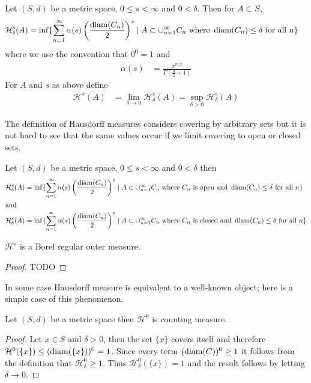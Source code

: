 \begin{defn}Let $(S,d)$ be a metric space, $0 \leq s < \infty$ and $0
  < \delta$.  Then for $A \subset S$, 
\begin{align*}
\mathcal{H}^s_\delta(A) &= \inf \lbrace \sum_{n=1}^\infty \alpha(s)
\left ( \frac{\operatorname*{diam}(C_n)}{2}\right )^s \mid A \subset
\cup_{n=1}^\infty C_n \text{ where } \operatorname*{diam}(C_n) \leq \delta \text{ for
  all } n\rbrace
\end{align*}
where we use the convention that $0^0=1$ and
\begin{align*}
\alpha(s) &= \frac{\pi^{n/2}}{\Gamma(\frac{n}{2} + 1)}
\end{align*}
For $A$ and $s$ as above define
\begin{align*}
\mathcal{H}^s(A) &= \lim_{\delta \to 0} \mathcal{H}_\delta^s(A) = \sup_{\delta>0} \mathcal{H}_\delta^s(A)
\end{align*}
\end{defn}

The definition of Hausdorff measures considers covering by arbitrary sets but it is not hard to see that 
the same values occur if we limit covering to open or closed sets.
\begin{prop}\label{HausdorffMeasureByOpenClosedCoverings}Let $(S,d)$ be a metric space, $0 \leq s < \infty$ and $0
  < \delta$ then 
\begin{align*}
\mathcal{H}^s_\delta(A) &= \inf \lbrace \sum_{n=1}^\infty \alpha(s)
\left ( \frac{\operatorname*{diam}(C_n)}{2}\right )^s \mid A \subset
\cup_{n=1}^\infty C_n \text{ where $C_n$ is open and } \operatorname*{diam}(C_n) \leq \delta \text{ for
  all } n\rbrace \\
\intertext{and}
\mathcal{H}^s_\delta(A) &= \inf \lbrace \sum_{n=1}^\infty \alpha(s)
\left ( \frac{\operatorname*{diam}(C_n)}{2}\right )^s \mid A \subset
\cup_{n=1}^\infty C_n \text{ where $C_n$ is closed and } \operatorname*{diam}(C_n) \leq \delta \text{ for
  all } n\rbrace
\end{align*}
\end{prop}

\begin{thm}\label{BorelRegularityOfHausdorffMeasure}$\mathcal{H}^s$ is a Borel regular outer measure.
\end{thm}
\begin{proof}
TODO
\end{proof}

In some case Hausdorff measure is equivalent to a well-known object; here is a simple case of this phenomenon.
\begin{prop}\label{HausdoffMeasureEqualsCounting}Let $(S,d)$ be  a metric space then $\mathcal{H}^0$ is counting measure.
\end{prop}
\begin{proof}
Let $x \in S$ and $\delta>0$, then the set $\lbrace x \rbrace$ covers itself and therefore $\mathcal{H}^0(\lbrace x \rbrace) \leq (\operatorname*{diam}(\lbrace x \rbrace))^0 = 1$.  Since every term
$(\operatorname*{diam}(C))^0 \geq 1$ it follows from the definition that $\mathcal{H}^0_\delta \geq 1$.  Thus $\mathcal{H}^0_\delta(\lbrace x \rbrace) = 1$ and the result follows by letting $\delta \to 0$.
\end{proof}

